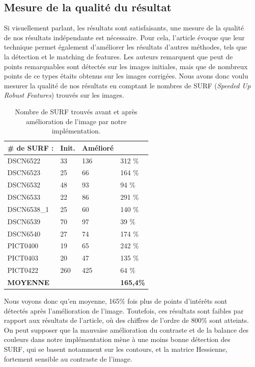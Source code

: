 \documentclass[twoside]{article}
\begin{document}
\subsection{Mesure de la qualité du résultat}
Si visuellement parlant, les résultats sont satisfaisants, une mesure de la qualité de nos résultats indépendante est nécessaire. Pour cela, l'article évoque que leur technique permet également d'améliorer les résultats d'autres méthodes, tels que la détection et le matching de features. Les auteurs remarquent que peut de points remarquables sont détectés sur les images initiales, mais que de nombreux points de ce types étaits obtenus sur les images corrigées. Nous avons donc voulu mesurer la qualité de nos résultats en comptant le nombres de SURF (\emph{Speeded Up Robust Features}) trouvés sur les images.

\begin{table}[H]
	\centering
    \begin{tabular}{llll}
    \# de SURF : &Init. &Amélioré\\
    \toprule
    DSCN6522     & 33       & 136        & 312 \%     \\
    DSCN6523     & 25       & 66         & 164 \%     \\
    DSCN6532     & 48       & 93         & 94 \%      \\
    DSCN6533     & 22       & 86         & 291 \%     \\
    DSCN6538\_1  & 25       & 60         & 140 \%     \\
    DSCN6539     & 70       & 97         & 39 \%      \\
    DSCN6540     & 27       & 74         & 174 \%     \\
    PICT0400     & 19       & 65         & 242 \%     \\
    PICT0403     & 20       & 47         & 135 \%     \\
    PICT0422     & 260      & 425        & 64 \%      \\
    \toprule
    \textbf{MOYENNE}        & &    & \textbf{165,4\%}      \\
    \end{tabular}
    \caption{Nombre de SURF trouvés avant et après amélioration de l'image par notre implémentation.}
\end{table}

Nous voyons donc qu'en moyenne, 165\% fois plus de points d'intérêts sont détectés après l'amélioration de l'image. Toutefois, ces résultats sont faibles par rapport aux résultats de l'article, où des chiffres de l'ordre de 800\% sont atteints. On peut supposer que la mauvaise amélioration du contraste et de la balance des couleurs dans notre implémentation mène à une moins bonne détection des SURF, qui se basent notamment sur les contours, et la matrice Hessienne, fortement sensible au contraste de l'image.
\end{document}

